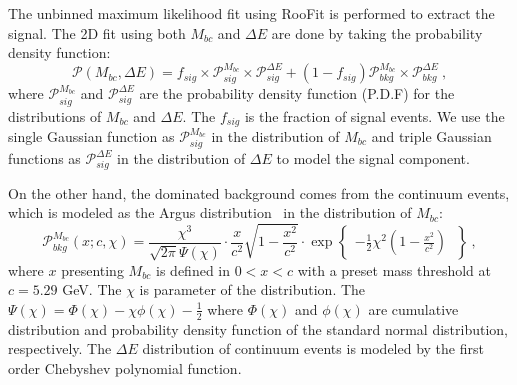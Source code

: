 The unbinned maximum likelihood fit using RooFit is performed to extract the signal. The 2D fit using both $M_{bc}$ and $\Delta{E}$ are done by taking the probability density function:
\begin{equation}\label{eq:pmbcde}
\mathcal{P}(M_{bc},\Delta{E}) = 
f_{sig}\times \mathcal{P}_{sig}^{M_{bc}}\times\mathcal{P}_{sig}^{\Delta{E}}
+ 
(1-f_{sig})\mathcal{P}_{bkg}^{M_{bc}}\times\mathcal{P}_{bkg}^{\Delta{E}} ~,
\end{equation}
where $\mathcal{P}_{sig}^{M_{bc}}$ and $\mathcal{P}_{sig}^{\Delta{E}}$ are the probability density function (P.D.F) for the distributions of $M_{bc}$ and $\Delta E$. The $f_{sig}$ is the fraction of signal events. We use the single Gaussian function as $\mathcal{P}_{sig}^{M_{bc}}$  in the distribution of $M_{bc}$ and triple Gaussian functions as $\mathcal{P}_{sig}^{\Delta{E}}$  in the distribution of $\Delta E$ to model the signal component. 

On the other hand, the dominated background comes from the continuum events, which is modeled as the Argus distribution~\cite{albrecht1990search} in the distribution of $M_{bc}$:
\begin{equation}\label{eq:Argus}
\mathcal{P}_{bkg}^{M_{bc}}(x;c,\chi)=\frac{\chi^3}{\sqrt{2\pi}\Psi(\chi)}\cdot
\frac{x}{c^2}\sqrt{1-\frac{x^2}{c^2}}\cdot
\exp \begin{Bmatrix}
-\frac{1}{2}\chi^2(1-\frac{x^2}{c^2}) ~
\end{Bmatrix}~,
\end{equation}
where $x$ presenting $M_{bc}$ is defined in $0<x<c$ with a preset mass threshold at $c = 5.29$ GeV. The $\chi$ is  parameter of the distribution. The $\Psi(\chi)=\Phi(\chi)-\chi\phi(\chi)-\frac{1}{2}$ where $\Phi(\chi)$ and $\phi(\chi)$ are cumulative distribution and probability density function of the standard normal distribution, respectively. The $\Delta E$ distribution of continuum events is modeled by the first order Chebyshev polynomial function.

